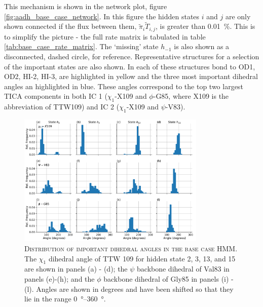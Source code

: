 This mechanism is shown in the network plot, figure \ref{fig:aadh_base_case_network}. In this figure the hidden states $i$ and $j$ are only shown connected if the flux between them, $\tilde{\pi}_{i}\tilde{T}_{i,j}$, is greater than \SI{0.01}{\percent}. This is to simplify the picture - the full rate matrix is tabulated in table \ref{tab:base_case_rate_matrix}. The `missing' state $h_{-1}$ is also shown as a disconnected, dashed circle, for reference. Representative structures for a selection of the important states are also shown. In each of these structures bond to OD1, OD2, HI-2, HI-3, are highlighted in yellow and the three most important dihedral angles an highlighted in blue. These angles correspond to the top two largest TICA components in both IC 1 ($\chi_1$-X109 and $\phi$-G85, where X109 is the abbreviation of TTW109) and IC 2 ($\chi_1$-X109 and $\psi$-V83). 
 
\begin{figure}
    \centering
    \caption[Distribution of important dihedral angles in the base case HMM]{\textsc{Distribution of important dihedral angles in the base case HMM}. The $\chi_{1}$ dihedral angle of TTW 109 for hidden state 2, 3, 13, and 15 are shown in panels (a) - (d); the $\psi$ backbone dihedral of Val83 in panels (e)-(h); and the $\phi$ backbone dihedral of Gly85 in panels (i) - (l). Angles are shown in degrees and have been shifted so that they lie in the range \SIrange{0}{360}{\degree}.}
    \label{fig:aadh_base_case_dihedrals}
    \includegraphics[width=0.8\textwidth]{chapters/aadh/figures/base_case_important_dihedrals.pdf}
\end{figure}

